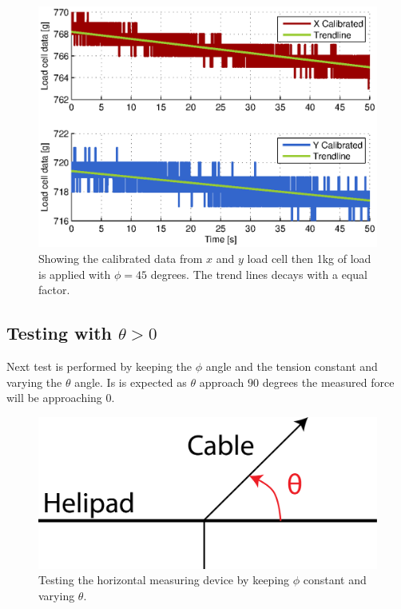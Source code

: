 \begin{figure}[hbtp]
\centering
\includegraphics[scale=1]{graphics/gcs_test/phi45deg1kgdata.eps}
\caption[Calibrated data from $x$ and $y$ load cell]{Showing the calibrated data from $x$ and $y$ load cell then 1kg of load is applied with $\phi=45$ degrees. The trend lines decays with a equal factor.}
\label{fig:phi45deg1kgdata}
\end{figure}


\newpage
\subsection{Testing with $\theta>0$}
Next test is performed by keeping the $\phi$ angle and the tension constant and varying the $\theta$ angle. Is is expected as $\theta$ approach $90$ degrees the measured force will be approaching $0$. 
\begin{figure}[hbtp]
\centering
\includegraphics[scale=0.75]{graphics/loadcell_test2.png}
\caption{Testing the horizontal measuring device by keeping $\phi$ constant and varying $\theta$.}
\label{fig:loadcell_test2}
\end{figure}

